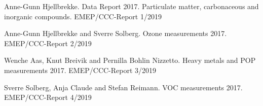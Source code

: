 


\enlargethispage{\baselineskip}

\begin{list}{}{\setlength{\leftmargin}{15pt}\setlength{\itemindent}{-\leftmargin}}\small

\item[]
Anne-Gunn Hjellbrekke. Data Report 2017. Particulate matter, carbonaceous and inorganic compounds. EMEP/CCC-Report 1/2019

\item[]
Anne-Gunn Hjellbrekke and Sverre Solberg. Ozone measurements 2017. EMEP/CCC-Report 2/2019

\item[]
Wenche Aas, Knut Breivik and Pernilla Bohlin Nizzetto. Heavy metals and POP measurements 2017.
EMEP/CCC-Report 3/2019

\item[]
Sverre Solberg, Anja Claude and Stefan Reimann. VOC measurements 2017. EMEP/CCC-Report 4/2019

\end{list}



